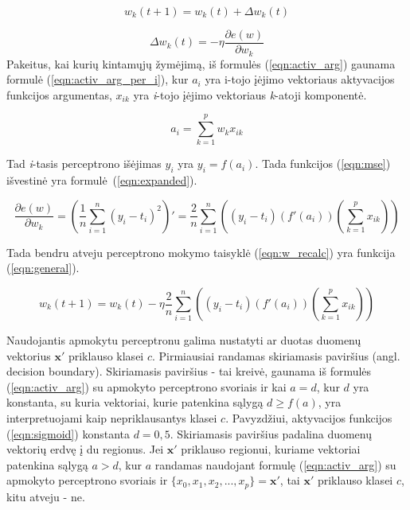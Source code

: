 \begin{equation}
	\label{eqn:w_recalc}
	w_k(t + 1) = w_k(t) + \Delta w_k(t)
\end{equation}

\begin{equation}
	\label{eqn:w_change}
	\Delta w_k(t) = - \eta \dfrac{\partial e(w)}{\partial w_k}
\end{equation}
Pakeitus, kai kurių kintamųjų žymėjimą, iš formulės (\ref{eqn:activ_arg}) gaunama formulė (\ref{eqn:activ_arg_per_i}), kur $a_i$ yra i-tojo įėjimo vektoriaus aktyvacijos funkcijos argumentas, $x_{ik}$ yra \textit{i}-tojo įėjimo vektoriaus \textit{k}-atoji komponentė.

\begin{equation}
	\label{eqn:activ_arg_per_i}
	a_i = \sum_{k = 1}^{p} w_{k}x_{ik}
\end{equation}

Tad \textit{i}-tasis perceptrono išėjimas $y_i$ yra $y_i = f(a_i)$. Tada funkcijos (\ref{eqn:mse}) išvestinė yra formulė~(\ref{eqn:expanded}).

\begin{equation}
	\label{eqn:expanded}
	\dfrac{\partial e(w)}{\partial w_k} = (\dfrac{1}{n}\sum_{i=1}^{n} (y_i - t_i)^2)'
		= \dfrac{2}{n}\sum_{i=1}^{n}
			((y_i - t_i)(f'(a_i))(\sum_{k = 1}^{p} x_{ik}))
\end{equation}

Tada bendru atveju perceptrono mokymo taisyklė (\ref{eqn:w_recalc}) yra funkcija (\ref{eqn:general}).

\begin{equation}
	\label{eqn:general}
	w_k(t + 1) = w_k(t) - \eta \dfrac{2}{n}\sum_{i=1}^{n} ((y_i - t_i)(f'(a_i))(\sum_{k = 1}^{p} x_{ik}))
\end{equation}

Naudojantis apmokytu perceptronu galima nustatyti ar duotas duomenų vektorius $\boldsymbol{x}'$ priklauso klasei $c$. Pirmiausiai randamas skiriamasis paviršius (angl. decision boundary). Skiriamasis paviršius - tai kreivė, gaunama iš formulės (\ref{eqn:activ_arg}) su apmokyto perceptrono svoriais ir kai $a = d$, kur $d$ yra konstanta, su kuria vektoriai, kurie patenkina sąlygą $d \ge f(a)$, yra interpretuojami kaip nepriklausantys klasei $c$. Pavyzdžiui, aktyvacijos funkcijos (\ref{eqn:sigmoid}) konstanta $d = 0,5$. Skiriamasis paviršius padalina duomenų vektorių erdvę į du regionus. Jei $\boldsymbol{x}'$ priklauso regionui, kuriame vektoriai patenkina sąlygą $a > d$, kur $a$ randamas naudojant formulę (\ref{eqn:activ_arg}) su apmokyto perceptrono svoriais ir $\{x_{0}, x_{1}, x_{2}, ..., x_{p}\} = \boldsymbol{x}'$, tai $\boldsymbol{x}'$ priklauso klasei $c$, kitu atveju - ne.